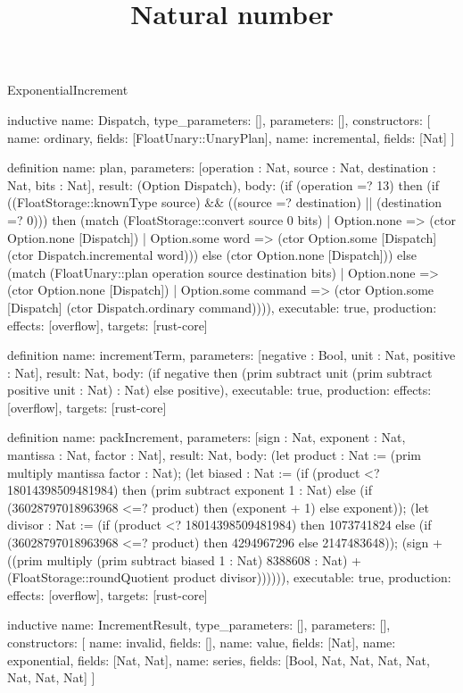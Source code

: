 \begin{lexlean}{ExponentialIncrement}
\title{Natural number}
\begin{semanticmodule}
inductive{
  name: Dispatch,
  type_parameters: [],
  parameters: [],
  constructors: [
    {name: ordinary, fields: [FloatUnary::UnaryPlan]},
    {name: incremental, fields: [Nat]}
  ]
}

definition{
  name: plan,
  parameters: [operation : Nat, source : Nat, destination : Nat, bits : Nat],
  result: (Option Dispatch),
  body: (if (operation =? 13) then
    (if ((FloatStorage::knownType source) && ((source =? destination) || (destination =? 0))) then
      (match (FloatStorage::convert source 0 bits)
        | Option.none => (ctor Option.none [Dispatch])
        | Option.some word => (ctor Option.some [Dispatch] (ctor Dispatch.incremental word))) else (ctor Option.none [Dispatch]))
    else (match (FloatUnary::plan operation source destination bits)
      | Option.none => (ctor Option.none [Dispatch])
      | Option.some command => (ctor Option.some [Dispatch] (ctor Dispatch.ordinary command)))),
  executable: true,
  production: {effects: [overflow], targets: [rust-core]}
}

definition{
  name: incrementTerm,
  parameters: [negative : Bool, unit : Nat, positive : Nat],
  result: Nat,
  body: (if negative then (prim subtract unit (prim subtract positive unit : Nat) : Nat) else positive),
  executable: true,
  production: {effects: [overflow], targets: [rust-core]}
}

definition{
  name: packIncrement,
  parameters: [sign : Nat, exponent : Nat, mantissa : Nat, factor : Nat],
  result: Nat,
  body: (let product : Nat := (prim multiply mantissa factor : Nat); (let biased : Nat := (if (product <? 18014398509481984) then (prim subtract exponent 1 : Nat) else (if (36028797018963968 <=? product) then (exponent + 1) else exponent)); (let divisor : Nat := (if (product <? 18014398509481984) then 1073741824 else (if (36028797018963968 <=? product) then 4294967296 else 2147483648)); (sign + ((prim multiply (prim subtract biased 1 : Nat) 8388608 : Nat) + (FloatStorage::roundQuotient product divisor)))))),
  executable: true,
  production: {effects: [overflow], targets: [rust-core]}
}


inductive{
  name: IncrementResult,
  type_parameters: [],
  parameters: [],
  constructors: [
    {name: invalid, fields: []},
    {name: value, fields: [Nat]},
    {name: exponential, fields: [Nat, Nat]},
    {name: series, fields: [Bool, Nat, Nat, Nat, Nat, Nat, Nat, Nat]}
  ]
}


\end{semanticmodule}
\end{lexlean}
